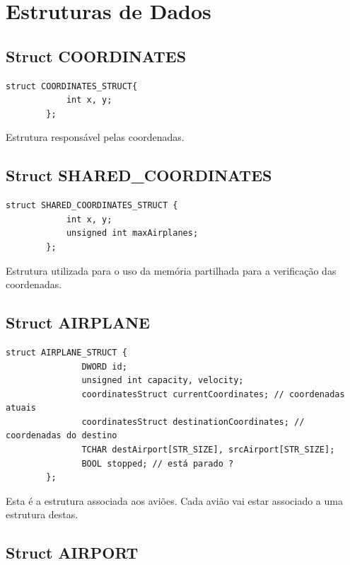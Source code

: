 \documentclass[11pt]{article}
\begin{document}
	\large
	\section{Estruturas de Dados}
	\subsection{Struct COORDINATES}
	\normalsize
	
	\begin{lstlisting}[caption=Struct COORDINATES]
	    struct COORDINATES_STRUCT{
	        int x, y;
	    };
	\end{lstlisting}
	
	Estrutura responsável pelas coordenadas.
	
	
	\large
	\subsection{Struct SHARED\_COORDINATES}
	\normalsize

	\begin{lstlisting}[caption=Struct SHARED\_COORDINATES]
		struct SHARED_COORDINATES_STRUCT {
        	int x, y;
        	unsigned int maxAirplanes;
        };
	\end{lstlisting}

	Estrutura utilizada para o uso da memória partilhada para a verificação das coordenadas.
	
	
    \large
	\subsection{Struct AIRPLANE}
	\normalsize

	\begin{lstlisting}[caption=Struct AIRPLANE]
		struct AIRPLANE_STRUCT {
			   DWORD id;
	           unsigned int capacity, velocity;
	           coordinatesStruct currentCoordinates; // coordenadas atuais
	           coordinatesStruct destinationCoordinates; // coordenadas do destino
	           TCHAR destAirport[STR_SIZE], srcAirport[STR_SIZE];
	           BOOL stopped; // está parado ?
		};
	\end{lstlisting}

	Esta é a estrutura associada aos aviões. Cada avião vai estar associado a uma estrutura destas.
	
	
	\large
	\subsection{Struct AIRPORT}
	\normalsize
\end{document}
